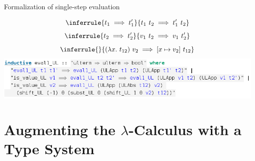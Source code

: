\documentclass[xcolor=dvipsnames]{beamer}
\begin{document}
\begin{frame}{Formalization of single-step evaluation}
  \begin{center}
    \small
    \begin{displaymath}
      \inferrule {t_1 \implies t_1'}{t_1 \ t_2 \implies t_1' \ t_2}
    \end{displaymath}
    \begin{displaymath}
      \inferrule {t_2 \implies t_2'}{v_1 \ t_2 \implies v_1 \ t_2'}
    \end{displaymath}
    \begin{displaymath}
      \inferrule {}{(\lambda x. \ t_{12}) \ v_2 \implies [x \mapsto v_2] \ t_{12}}
    \end{displaymath}
    \pause
    \vspace{20pt}
    \includegraphics[scale=0.4]{eval1.png}
  \end{center}
\end{frame}


\section{Augmenting the $\lambda$-Calculus with a Type System}
\end{document}
